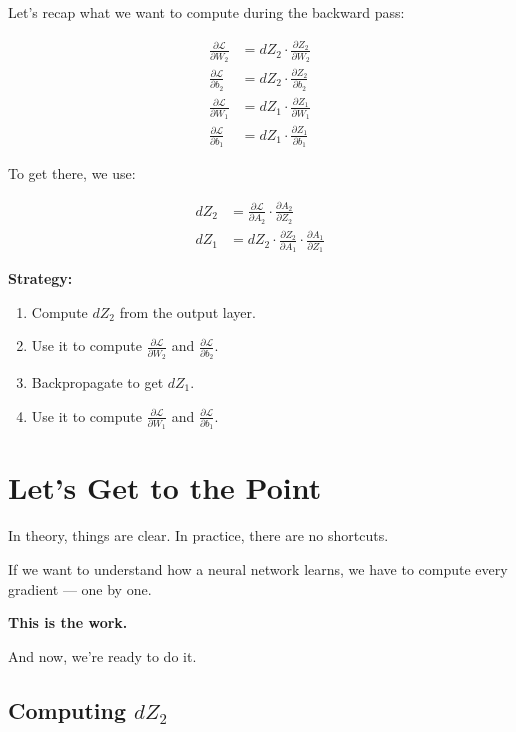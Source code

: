 \documentclass[11pt]{article}
\begin{document}
Let’s recap what we want to compute during the backward pass:

\[
\begin{aligned}
\frac{\partial \mathcal{L}}{\partial W_2} &= dZ_2 \cdot \frac{\partial Z_2}{\partial W_2} \\
\frac{\partial \mathcal{L}}{\partial b_2} &= dZ_2 \cdot \frac{\partial Z_2}{\partial b_2} \\
\frac{\partial \mathcal{L}}{\partial W_1} &= dZ_1 \cdot \frac{\partial Z_1}{\partial W_1} \\
\frac{\partial \mathcal{L}}{\partial b_1} &= dZ_1 \cdot \frac{\partial Z_1}{\partial b_1}
\end{aligned}
\]

To get there, we use:

\[
\begin{aligned}
dZ_2 &= \frac{\partial \mathcal{L}}{\partial A_2} \cdot \frac{\partial A_2}{\partial Z_2} \\
dZ_1 &= dZ_2 \cdot \frac{\partial Z_2}{\partial A_1} \cdot \frac{\partial A_1}{\partial Z_1}
\end{aligned}
\]

\noindent
\textbf{Strategy:}
\begin{enumerate}
    \item Compute $dZ_2$ from the output layer.
    \item Use it to compute $\frac{\partial \mathcal{L}}{\partial W_2}$ and $\frac{\partial \mathcal{L}}{\partial b_2}$.
    \item Backpropagate to get $dZ_1$.
    \item Use it to compute $\frac{\partial \mathcal{L}}{\partial W_1}$ and $\frac{\partial \mathcal{L}}{\partial b_1}$.
\end{enumerate}

\section{Let's Get to the Point}

In theory, things are clear.  
In practice, there are no shortcuts.

If we want to understand how a neural network learns,  
we have to compute every gradient — one by one.

\textbf{This is the work.}

And now, we’re ready to do it.

\subsection{Computing $dZ_2$}
\end{document}

